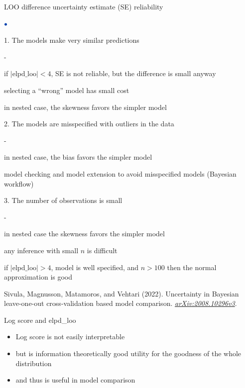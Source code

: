 \documentclass[english,t]{beamer}
\newenvironment{list1}{
   \begin{list}{$\color{list1}\bullet$}{\itemsep=6pt}}{
  \end{list}}
\newenvironment{list2}{
  \begin{list}{-}{\baselineskip=12pt\itemsep=2pt}}{
  \end{list}}
\begin{document}
\begin{frame}{LOO difference uncertainty estimate (SE) reliability}
\vspace{-0.2\baselineskip}

  \begin{list1}
  \item[1.] The models make very similar predictions
    \begin{list2}
    \item<2-> if $|\mbox{elpd\_loo}|<4$, SE is not reliable, but the
      difference is small anyway
    \item<2-> selecting a ``wrong'' model has small cost
    \item<2-> in nested case, the skewness favors the simpler model
    \end{list2}
  \item[2.] The models are misspecified with outliers in the data
    \begin{list2}
    \item<3-> in nested case, the bias favors the simpler model
    \item<3-> model checking and model extension to avoid misspecified
      models (Bayesian workflow)
    \end{list2}
  \item[3.] The number of observations is small
    \begin{list2}
    \item<4-> in nested case the skewness favors the simpler model
    \item<4-> any inference with small $n$ is difficult
    \item<4-> if $|\mbox{elpd\_loo}|>4$, model is well specified,
      and $n>100$ then the normal approximation is good
    \end{list2}
  \end{list1}

{\color{gray}\footnotesize  Sivula, Magnusson, Matamoros, and Vehtari (2022). Uncertainty in Bayesian leave-one-out cross-validation based model comparison. \textit{\href{https://arxiv.org/abs/2008.10296v3}{arXiv:2008.10296v3}}.}
  
\end{frame}

\begin{frame}{Log score and elpd\_loo}

  \begin{itemize}
  \item Log score is not easily interpretable
  \item but is information theoretically good utility for the goodness
    of the whole distribution
  \item and thus is useful in model comparison
  \end{itemize}

\end{frame}
\end{document}
